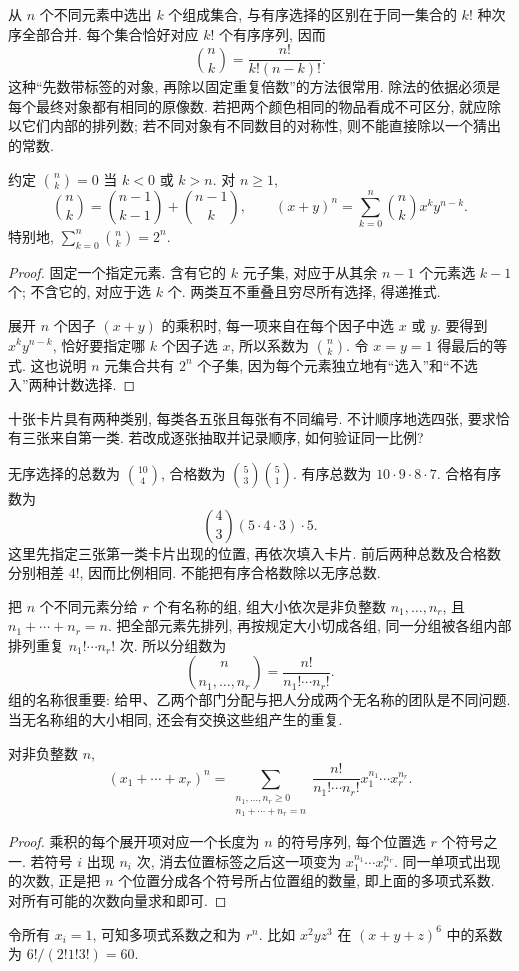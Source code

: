 从 $n$ 个不同元素中选出 $k$ 个组成集合, 与有序选择的区别在于同一集合的 $k!$ 种次序全部合并. 每个集合恰好对应 $k!$ 个有序序列, 因而
\[
 \binom nk=\frac{n!}{k!(n-k)!}.
\]
这种``先数带标签的对象, 再除以固定重复倍数''的方法很常用. 除法的依据必须是每个最终对象都有相同的原像数. 若把两个颜色相同的物品看成不可区分, 就应除以它们内部的排列数; 若不同对象有不同数目的对称性, 则不能直接除以一个猜出的常数.

\begin{proposition}
约定 $\binom nk=0$ 当 $k<0$ 或 $k>n$. 对 $n\geq1$,
\[
 \binom nk=\binom{n-1}{k-1}+\binom{n-1}{k},\qquad
 (x+y)^n=\sum_{k=0}^n\binom nk x^ky^{n-k}.
\]
特别地, $\sum_{k=0}^n\binom nk=2^n$.
\end{proposition}
\begin{proof}
固定一个指定元素. 含有它的 $k$ 元子集, 对应于从其余 $n-1$ 个元素选 $k-1$ 个; 不含它的, 对应于选 $k$ 个. 两类互不重叠且穷尽所有选择, 得递推式.

展开 $n$ 个因子 $(x+y)$ 的乘积时, 每一项来自在每个因子中选 $x$ 或 $y$. 要得到 $x^ky^{n-k}$, 恰好要指定哪 $k$ 个因子选 $x$, 所以系数为 $\binom nk$. 令 $x=y=1$ 得最后的等式. 这也说明 $n$ 元集合共有 $2^n$ 个子集, 因为每个元素独立地有``选入''和``不选入''两种计数选择.
\end{proof}

\begin{example}
十张卡片具有两种类别, 每类各五张且每张有不同编号. 不计顺序地选四张, 要求恰有三张来自第一类. 若改成逐张抽取并记录顺序, 如何验证同一比例?
\end{example}
\begin{solution}
无序选择的总数为 $\binom{10}{4}$, 合格数为 $\binom53\binom51$. 有序总数为 $10\cdot9\cdot8\cdot7$. 合格有序数为
\[
 \binom43(5\cdot4\cdot3)\cdot5.
\]
这里先指定三张第一类卡片出现的位置, 再依次填入卡片. 前后两种总数及合格数分别相差 $4!$, 因而比例相同. 不能把有序合格数除以无序总数.
\end{solution}

把 $n$ 个不同元素分给 $r$ 个有名称的组, 组大小依次是非负整数 $n_1,\ldots,n_r$, 且 $n_1+\cdots+n_r=n$. 把全部元素先排列, 再按规定大小切成各组, 同一分组被各组内部排列重复 $n_1!\cdots n_r!$ 次. 所以分组数为
\[
 \binom{n}{n_1,\ldots,n_r}=\frac{n!}{n_1!\cdots n_r!}.
\]
组的名称很重要: 给甲、乙两个部门分配与把人分成两个无名称的团队是不同问题. 当无名称组的大小相同, 还会有交换这些组产生的重复.

\begin{theorem}[多项式定理]
对非负整数 $n$,
\[
 (x_1+\cdots+x_r)^n
 =\sum_{\substack{n_1,\ldots,n_r\geq0\\n_1+\cdots+n_r=n}}
 \frac{n!}{n_1!\cdots n_r!}x_1^{n_1}\cdots x_r^{n_r}.
\]
\end{theorem}
\begin{proof}
乘积的每个展开项对应一个长度为 $n$ 的符号序列, 每个位置选 $r$ 个符号之一. 若符号 $i$ 出现 $n_i$ 次, 消去位置标签之后这一项变为 $x_1^{n_1}\cdots x_r^{n_r}$. 同一单项式出现的次数, 正是把 $n$ 个位置分成各个符号所占位置组的数量, 即上面的多项式系数. 对所有可能的次数向量求和即可.
\end{proof}
令所有 $x_i=1$, 可知多项式系数之和为 $r^n$. 比如 $x^2yz^3$ 在 $(x+y+z)^6$ 中的系数为 $6!/(2!1!3!)=60$.

